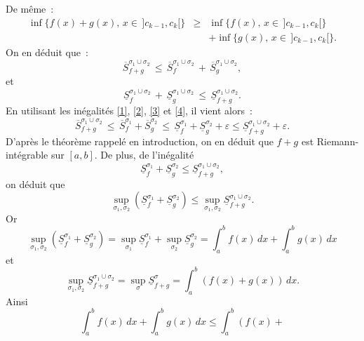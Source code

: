 {\begin{enumerate}
{De m\^eme~:
\begin{eqnarray*}
\inf\{f(x) + g(x), \,x \in \,]c_{k-1}, c_{k}[\} & \geq &
\inf\{f(x),\,x \in \,]c_{k-1}, c_{k}[\}\\ & & + \inf\{g(x), \,x
\in \,]c_{k-1}, c_{k}[\}.
\end{eqnarray*}
On en d\'eduit que~:
\begin{equation}\label{3}
\overline{S}_{f+g}^{\sigma_{1}\cup\sigma_{2}} \,\leq\,
\overline{S}_{f}^{\sigma_{1}\cup\sigma_{2}}\,+\,\overline{S}_{g}^{\sigma_{1}\cup\sigma_{2}},
\end{equation}
et
\begin{equation}\label{4}
\underline{S}_{f}^{\sigma_{1}\cup\sigma_{2}}\,+\,
\underline{S}_{g}^{\sigma_{1}\cup\sigma_{2}} \,\leq\,
\underline{S}_{f+g}^{\sigma_{1}\cup\sigma_{2}}.
\end{equation}
En utilisant les in\'egalit\'es \eqref{1}, \eqref{2}, \eqref{3} et
\eqref{4}, il vient alors~:
\begin{equation*}
\overline{S}_{f+g}^{\sigma_{1}\cup\sigma_{2}}\,\leq\,
\overline{S}_{f}^{\sigma_{1}}+
\overline{S}_{g}^{\sigma_{2}}\,\leq\,
\underline{S}_{f}^{\sigma_{1}} + \underline{S}_{g}^{\sigma_{2}} +
\varepsilon \leq \underline{S}_{f+g}^{\sigma_{1}\cup\sigma_{2}} +
\varepsilon.
\end{equation*}
D'apr\`es le th\'eor\`eme rappel\'e en introduction, on en d\'eduit que $f+g$ est
Riemann-int\'egrable sur $[a, b]$. De plus, de l'in\'egalit\'e
\begin{equation*}
\underline{S}_{f}^{\sigma_{1}} + \underline{S}_{g}^{\sigma_{2}}
\leq \underline{S}_{f+g}^{\sigma_{1}\cup\sigma_{2}},
\end{equation*}
on d\'eduit que
\begin{equation*}
\sup_{\sigma_1, \sigma_{2}}\left(\underline{S}_{f}^{\sigma_{1}} +
\underline{S}_{g}^{\sigma_{2}} \right) \leq \sup_{\sigma_1,
\sigma_{2}}\underline{S}_{f+g}^{\sigma_{1}\cup\sigma_{2}}.
\end{equation*}
Or $$\sup_{\sigma_1,
\sigma_{2}}\left(\underline{S}_{f}^{\sigma_{1}} +
\underline{S}_{g}^{\sigma_{2}} \right) =
\sup_{\sigma_{1}}\underline{S}_{f}^{\sigma_{1}} +
\sup_{\sigma_{2}}\underline{S}_{g}^{\sigma_{2}} = \int_{a}^{b}
f(x)\,dx + \int_{a}^{b} g(x)\,dx $$ et
$$\sup_{\sigma_1,
\sigma_{2}}\underline{S}_{f+g}^{\sigma_{1}\cup\sigma_{2}} =
\sup_{\sigma}\underline{S}_{f+g}^{\sigma} = \int_{a}^{b}\left(f(x)
+ g(x)\right)\,dx.$$ Ainsi
\begin{equation*}
 \int_{a}^{b}
f(x)\,dx + \int_{a}^{b} g(x)\,dx \leq \int_{a}^{b}\left(f(x) +

\end{equation*}}
\end{enumerate}}

